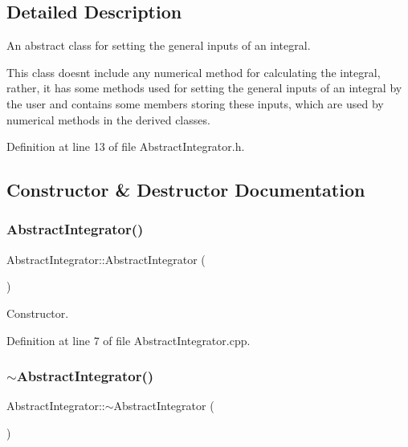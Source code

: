 \subsection{Detailed Description}
An abstract class for setting the general inputs of an integral. 

This class doesn\textquotesingle{}t include any numerical method for calculating the integral, rather, it has some methods used for setting the general inputs of an integral by the user and contains some members storing these inputs, which are used by numerical methods in the derived classes. 

Definition at line 13 of file Abstract\+Integrator.\+h.



\subsection{Constructor \& Destructor Documentation}
\mbox{\label{class_abstract_integrator_aa88168bae2057a179c9ecc2ba9639f61}} 
\subsubsection{\texorpdfstring{Abstract\+Integrator()}{AbstractIntegrator()}}
{\footnotesize\ttfamily Abstract\+Integrator\+::\+Abstract\+Integrator (\begin{DoxyParamCaption}{ }\end{DoxyParamCaption})}



Constructor. 



Definition at line 7 of file Abstract\+Integrator.\+cpp.

\mbox{\label{class_abstract_integrator_addc528450d3f1d6e5d2cbd81e7d545e0}} 
\subsubsection{\texorpdfstring{$\sim$\+Abstract\+Integrator()}{~AbstractIntegrator()}}
{\footnotesize\ttfamily Abstract\+Integrator\+::$\sim$\+Abstract\+Integrator (\begin{DoxyParamCaption}{ }\end{DoxyParamCaption})\hspace{0.3cm}{\ttfamily [virtual]}}



